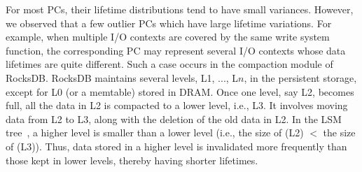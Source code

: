 For most PCs, their lifetime distributions tend to have small variances.  
However, we observed that a few outlier PCs which have large lifetime variations. 
For example, when multiple I/O contexts are covered by the same write system function, 
the corresponding PC may represent several I/O contexts whose data lifetimes are quite different.   
Such a case occurs %
in the compaction module of RocksDB.
RocksDB maintains
several levels, L1, ..., L$n$, in the persistent storage, except for L0 (or a
memtable) stored in DRAM.  Once one level, say L2, becomes full, all the data
in L2 is compacted to a lower level, i.e., L3.  It involves moving data from L2
to L3, along with the deletion of the old data in L2.  In the
LSM tree~\cite{LSM}, a higher level is smaller than a lower level 
(i.e., the size of (L2) $<$ the size of (L3)). 
Thus, data stored in a higher level is invalidated more frequently than those kept
in lower levels, thereby having shorter lifetimes.



